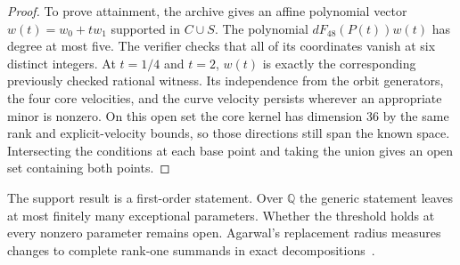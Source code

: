 \documentclass[11pt,reqno]{amsart}
\newcommand{\Q}{\mathbb Q}
\begin{document}
\begin{proof}
To prove attainment, the archive gives an affine polynomial vector \(w(t)=w_0+tw_1\) supported in \(C\cup S\). The polynomial \(dF_{48}(P(t))w(t)\) has degree at most five. The verifier checks that all of its coordinates vanish at six distinct integers. At \(t=1/4\) and \(t=2\), \(w(t)\) is exactly the corresponding previously checked rational witness. Its independence from the orbit generators, the four core velocities, and the curve velocity persists wherever an appropriate minor is nonzero. On this open set the core kernel has dimension 36 by the same rank and explicit-velocity bounds, so those directions still span the known space. Intersecting the conditions at each base point and taking the union gives an open set containing both points.
\end{proof}

The support result is a first-order statement. Over \(\Q\) the generic statement leaves at most finitely many exceptional parameters. Whether the threshold holds at every nonzero parameter remains open. Agarwal's replacement radius measures changes to complete rank-one summands in exact decompositions~\cite{agarwal}.
\end{document}

